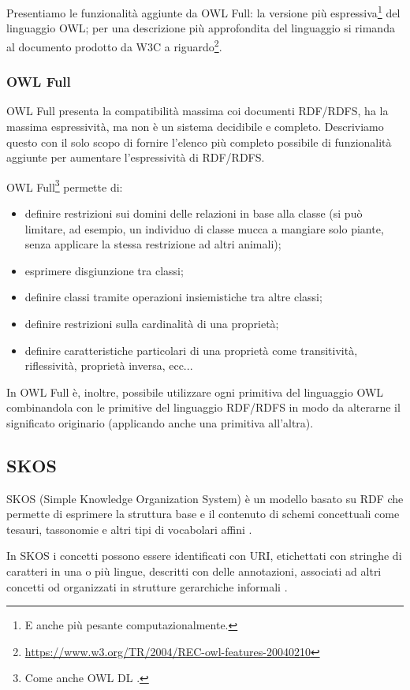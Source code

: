 Presentiamo le funzionalità aggiunte da OWL Full: la versione più espressiva\footnote{E anche più pesante computazionalmente.} del linguaggio OWL; per una descrizione più approfondita del linguaggio si rimanda al documento prodotto da W3C a riguardo\footnote{\url{https://www.w3.org/TR/2004/REC-owl-features-20040210}}.
\subsubsection{OWL Full}
OWL Full presenta la compatibilità massima coi documenti RDF/RDFS, ha la massima espressività, ma non è un sistema decidibile e completo. Descriviamo questo con il solo scopo di fornire l'elenco più completo possibile di funzionalità aggiunte per aumentare l'espressività di RDF/RDFS.

OWL Full\footnote{Come anche OWL DL \cite{antoniou2009web}.} permette di:
\begin{itemize}
	\item definire restrizioni sui domini delle relazioni in base alla classe (si può limitare, ad esempio, un individuo di classe mucca a mangiare solo piante, senza applicare la stessa restrizione ad altri animali);
	\item esprimere disgiunzione tra classi;
	\item definire classi tramite operazioni insiemistiche tra altre classi;
	\item definire restrizioni sulla cardinalità di una proprietà;
	\item definire caratteristiche particolari di una proprietà come transitività, riflessività, proprietà inversa, ecc...
\end{itemize}

In OWL Full è, inoltre, possibile utilizzare ogni primitiva del linguaggio OWL combinandola con le primitive del linguaggio RDF/RDFS in modo da alterarne il significato originario (applicando anche una primitiva all'altra).
\subsection{SKOS}
SKOS (Simple Knowledge Organization System) è un modello basato su RDF che permette di esprimere la struttura base e il contenuto di schemi concettuali come tesauri, tassonomie e altri tipi di vocabolari affini \cite{isaac2009skos}.

In SKOS i concetti possono essere identificati con URI, etichettati con stringhe di caratteri in una o più lingue, descritti con delle annotazioni, associati ad altri concetti od organizzati in strutture gerarchiche informali \cite{miles2009skos}.

